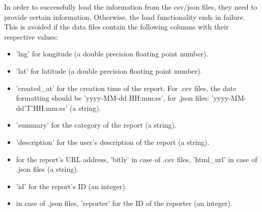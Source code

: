 \documentclass{article}
\begin{document}
		In order to successfully load the information from the csv/json files, they need to provide 
		certain information. Otherwise, the load functionality ends in failure. This is avoided
		if the data files contain the following columns with their respective values:
		\begin{itemize}
			\item 'lng' for longitude (a double precision floating point number).
			\item 'lat' for latitude (a double precision floating point number).
			\item 'created\_at' for the creation time of the report. For .csv files, 
				the date formatting should be 'yyyy-MM-dd HH:mm:ss', for .json files: 
				'yyyy-MM-dd'T'HH:mm:ss' (a string).
			\item 'summary' for the category of the report (a string).
			\item 'description' for the user's description of the report (a string).
			\item for the report's URL address, 'bitly' in case of .csv files, 
				'html\_url' in case of .json files (a string).
			\item 'id' for the report's ID (an integer).
			\item in case of .json files, 'reporter' for the ID of the reporter (an integer).
		\end{itemize}
		
\end{document}
